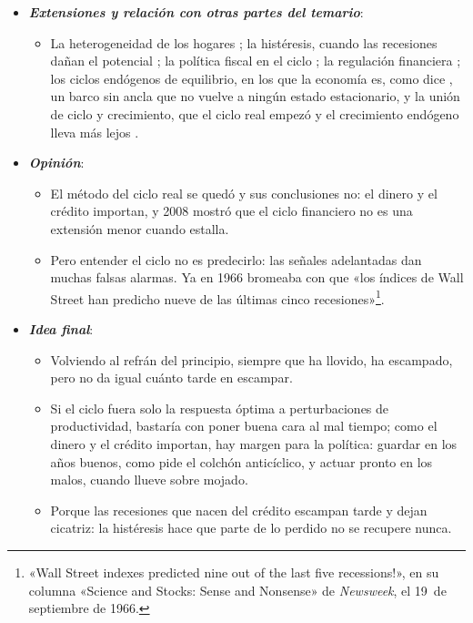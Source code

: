 \documentclass[11pt]{article}
\begin{document}
\begin{itemize}
\begin{itemize}
  \item Los bancos centrales y la Comisión estiman el potencial y la brecha para fijar los tipos y el saldo estructural, y desde 2008 los supervisores miden también el ciclo financiero.
  \end{itemize}
\item \textbf{\emph{Extensiones y relación con otras partes del temario}}:
  \begin{itemize}
  \item La heterogeneidad de los hogares ; la histéresis, cuando las recesiones dañan el potencial ; la política fiscal en el ciclo ; la regulación financiera ; los ciclos endógenos de equilibrio, en los que la economía es, como dice , un barco sin ancla que no vuelve a ningún estado estacionario\nocite{Farmer2010Expectations}, y la unión de ciclo y crecimiento, que el ciclo real empezó y el crecimiento endógeno lleva más lejos .
  \end{itemize}
\item \textbf{\emph{Opinión}}:
  \begin{itemize}
  \item El método del ciclo real se quedó y sus conclusiones no: el dinero y el crédito importan, y 2008 mostró que el ciclo financiero no es una extensión menor cuando estalla.

  \item Pero entender el ciclo no es predecirlo: las señales adelantadas dan muchas falsas alarmas. Ya en 1966 bromeaba  con que «los índices de Wall Street han predicho nueve de las últimas cinco recesiones»\footnote{«Wall Street indexes predicted nine out of the last five recessions!», en su columna «Science and Stocks: Sense and Nonsense» de \emph{Newsweek}, el 19~de septiembre de 1966\nocite{Samuelson1966Newsweek}.}.
  \end{itemize}
\item \textbf{\emph{Idea final}}:
  \begin{itemize}
  \item Volviendo al refrán del principio, siempre que ha llovido, ha escampado, pero no da igual cuánto tarde en escampar.

  \item Si el ciclo fuera solo la respuesta óptima a perturbaciones de productividad, bastaría con poner buena cara al mal tiempo; como el dinero y el crédito importan, hay margen para la política: guardar en los años buenos, como pide el colchón anticíclico, y actuar pronto en los malos, cuando llueve sobre mojado.

  \item Porque las recesiones que nacen del crédito escampan tarde y dejan cicatriz: la histéresis hace que parte de lo perdido no se recupere nunca.
  \end{itemize}
\end{itemize}
\end{document}
